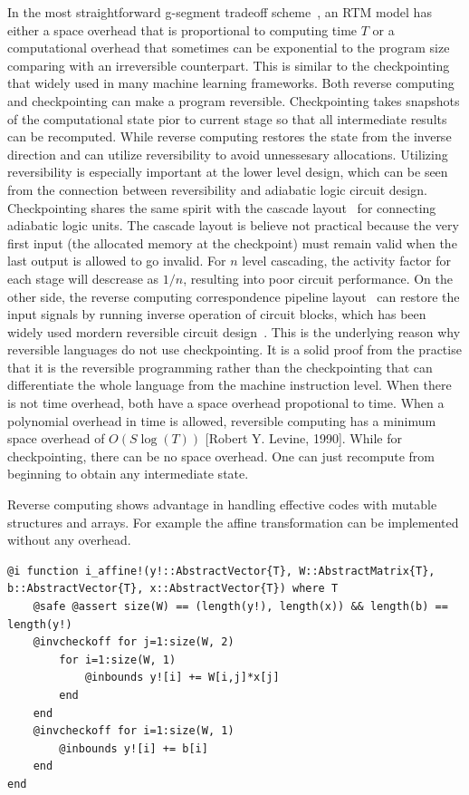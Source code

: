 \documentclass{article}
\newcommand{\<}{\langle}
\renewcommand{\>}{\rangle}
\theoremstyle{definition}\newtheorem{definition}{\textit{Definition}}
\begin{document}
In the most straightforward g-segment tradeoff scheme~\cite{Bennett1989,Levine1990,Perumalla2013}, an RTM model has either a space overhead that is proportional to computing time $T$ or a computational overhead that sometimes can be exponential to the program size comparing with an irreversible counterpart.
This is similar to the checkpointing~\cite{Griewank2008, Chen2016} that widely used in many machine learning frameworks.
Both reverse computing and checkpointing can make a program reversible.
Checkpointing takes snapshots of the computational state pior to current stage so that all intermediate results can be recomputed.
While reverse computing restores the state from the inverse direction and can utilize reversibility to avoid unnessesary allocations.
Utilizing reversibility is especially important at the lower level design, which can be seen from the connection between reversibility and adiabatic logic circuit design.
Checkpointing shares the same spirit with the cascade layout~\cite{Hall1992} for connecting adiabatic logic units.
The cascade layout is believe not practical because the very first input (the allocated memory at the checkpoint) must remain valid when the last output is allowed to go invalid. For $n$ level cascading, the activity factor for each stage will descrease as $1/n$, resulting into poor circuit performance.
On the other side, the reverse computing correspondence pipeline layout~\cite{Athas1994} can restore the input signals by running inverse operation of circuit blocks, which has been widely used mordern reversible circuit design~\cite{Anantharam2004}.
This is the underlying reason why reversible languages do not use checkpointing.
It is a solid proof from the practise that it is the reversible programming rather than the checkpointing that can differentiate the whole language from the machine instruction level.
When there is not time overhead, both have a space overhead propotional to time.
When a polynomial overhead in time is allowed, reversible computing has a minimum space overhead of $O(S\log(T))$  [Robert Y. Levine, 1990]. While for checkpointing, there can be no space overhead. One can just recompute from beginning to obtain any intermediate state.

Reverse computing shows advantage in handling effective codes with mutable structures and arrays.
For example the affine transformation can be implemented without any overhead.
\begin{minipage}{.88\columnwidth}
\begin{lstlisting}[mathescape=true,caption={Affine transformation without extra memory cost.},label={lst:affine}]
@i function i_affine!(y!::AbstractVector{T}, W::AbstractMatrix{T}, b::AbstractVector{T}, x::AbstractVector{T}) where T
    @safe @assert size(W) == (length(y!), length(x)) && length(b) == length(y!)
    @invcheckoff for j=1:size(W, 2)
        for i=1:size(W, 1)
            @inbounds y![i] += W[i,j]*x[j]
        end
    end
    @invcheckoff for i=1:size(W, 1)
        @inbounds y![i] += b[i]
    end
end
\end{lstlisting}
\end{minipage}
\end{document}
